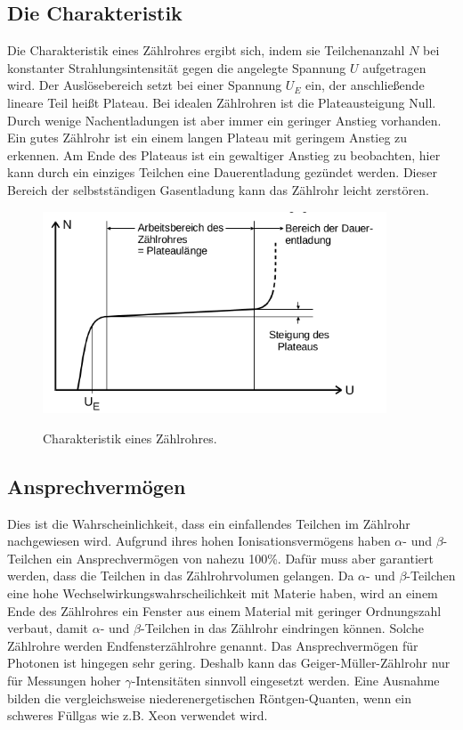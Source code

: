 \subsection{Die Charakteristik}
Die Charakteristik eines Zählrohres ergibt sich, indem sie Teilchenanzahl $N$ bei konstanter
Strahlungsintensität gegen die angelegte Spannung $U$ aufgetragen wird.
Der Auslösebereich setzt bei einer Spannung $U_E$ ein, der anschließende lineare Teil
heißt Plateau. Bei idealen Zählrohren ist die Plateausteigung Null.
Durch wenige Nachentladungen ist aber immer ein geringer Anstieg vorhanden.
Ein gutes Zählrohr ist ein einem langen Plateau mit geringem Anstieg zu erkennen.
Am Ende des Plateaus ist ein gewaltiger Anstieg zu beobachten, hier kann durch ein einziges
Teilchen eine Dauerentladung gezündet werden. Dieser Bereich der selbstständigen Gasentladung
kann das Zählrohr leicht zerstören.

\begin{figure}
  \centering
  \includegraphics[height=6cm]{plateau.png}
  \caption{Charakteristik eines Zählrohres.}
  \cite{skript}
\end{figure}

\subsection{Ansprechvermögen}
Dies ist die Wahrscheinlichkeit, dass ein einfallendes Teilchen im Zählrohr
nachgewiesen wird. Aufgrund ihres hohen Ionisationsvermögens haben
$\alpha$- und $\beta$-Teilchen ein Ansprechvermögen von nahezu 100\%.
Dafür muss aber garantiert werden, dass die Teilchen in das Zählrohrvolumen gelangen.
Da $\alpha$- und $\beta$-Teilchen eine hohe Wechselwirkungswahrscheilichkeit mit Materie
haben, wird an einem Ende des Zählrohres ein Fenster aus einem Material mit
geringer Ordnungszahl verbaut, damit $\alpha$- und $\beta$-Teilchen in das Zählrohr eindringen
können. Solche Zählrohre werden Endfensterzählrohre genannt.
Das Ansprechvermögen für Photonen ist hingegen sehr gering. Deshalb kann das
Geiger-Müller-Zählrohr nur für Messungen hoher $\gamma$-Intensitäten sinnvoll
eingesetzt werden. Eine Ausnahme bilden die vergleichsweise niederenergetischen
Röntgen-Quanten, wenn ein schweres Füllgas wie z.B. Xeon verwendet wird.
